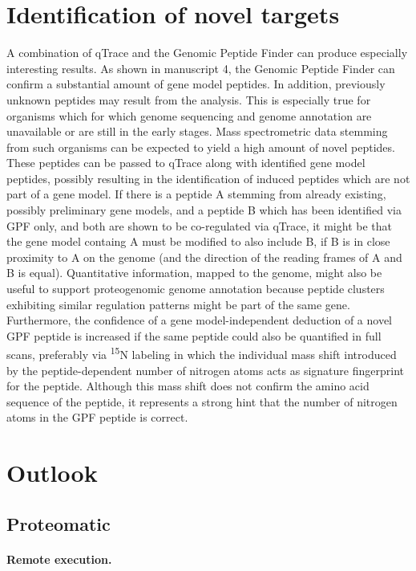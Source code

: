 \section{Identification of novel targets}

A combination of qTrace and the Genomic Peptide Finder can produce especially
interesting results.
As shown in manuscript 4, the Genomic Peptide Finder can confirm a substantial
amount of gene model peptides.
In addition, previously unknown peptides may result from the analysis.
This is especially true for organisms which for which genome sequencing and
genome annotation are unavailable or are still in the early stages.
Mass spectrometric data stemming from such organisms can be expected to
yield a high amount of novel peptides.
These peptides can be passed to qTrace along with identified gene model 
peptides, possibly resulting in the identification of induced peptides which
are not part of a gene model.
If there is a peptide A stemming from already existing, possibly preliminary gene
models, and a peptide B which has been identified via GPF only, and both
are shown to be co-regulated via qTrace, it might be that the gene model
containg A must be modified to also include B, if B is in close proximity to A
on the genome (and the direction of the reading frames of A and B is equal).
Quantitative information, mapped to the genome, might also be useful to
support proteogenomic genome annotation because peptide clusters exhibiting 
similar regulation patterns might be part of the same gene.
Furthermore, the confidence of a gene model-independent deduction of a novel 
GPF peptide is increased if the same peptide could also be quantified in full
scans, preferably via \textsuperscript{15}N labeling in which the individual
mass shift introduced by the peptide-dependent number of nitrogen atoms acts
as signature fingerprint for the peptide.
Although this mass shift does not confirm the amino acid sequence of the 
peptide, it represents a strong hint that the number of nitrogen atoms in
the GPF peptide is correct.

\section{Outlook}

\subsection{Proteomatic}

\paragraph{Remote execution.}

